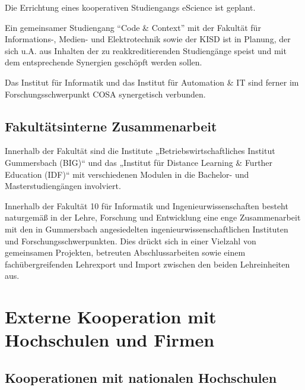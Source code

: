 Die Errichtung eines kooperativen Studiengangs eScience ist geplant.

Ein gemeinsamer Studiengang ``Code \& Context'' mit der Fakultät für
Informations-, Medien- und Elektrotechnik sowie der KISD ist in Planung,
der sich u.A. aus Inhalten der zu reakkreditierenden Studiengänge speist
und mit dem entsprechende Synergien geschöpft werden sollen.

Das Institut für Informatik und das Institut für Automation \& IT sind
ferner im Forschungsschwerpunkt COSA synergetisch verbunden.

\subsection{Fakultätsinterne
Zusammenarbeit\label{/mi-2017/selbstbericht/0700-studiengangsbezogene-kooperationen/0000-studiengangsbezogene-kooperationen}}\label{fakultuxe4tsinterne-zusammenarbeitpathlabelmi-2017selbstbericht0700-studiengangsbezogene-kooperationen0000-studiengangsbezogene-kooperationen}

Innerhalb der Fakultät sind die Institute „Betriebswirtschaftliches
Institut Gummersbach (BIG)`` und das „Institut für Distance Learning \&
Further Education (IDF)`` mit verschiedenen Modulen in die Bachelor- und
Masterstudiengängen involviert.

Innerhalb der Fakultät 10 für Informatik und Ingenieurwissenschaften
besteht naturgemäß in der Lehre, Forschung und Entwicklung eine enge
Zusammenarbeit mit den in Gummersbach angesiedelten
ingenieurwissenschaftlichen Instituten und Forschungsschwerpunkten. Dies
drückt sich in einer Vielzahl von gemeinsamen Projekten, betreuten
Abschlussarbeiten sowie einem fachübergreifenden Lehrexport und Import
zwischen den beiden Lehreinheiten aus.

\section{Externe Kooperation mit Hochschulen und
Firmen\label{/mi-2017/selbstbericht/0700-studiengangsbezogene-kooperationen/0000-studiengangsbezogene-kooperationen}}\label{externe-kooperation-mit-hochschulen-und-firmenpathlabelmi-2017selbstbericht0700-studiengangsbezogene-kooperationen0000-studiengangsbezogene-kooperationen}

\subsection{Kooperationen mit nationalen
Hochschulen\label{/mi-2017/selbstbericht/0700-studiengangsbezogene-kooperationen/0000-studiengangsbezogene-kooperationen}}\label{kooperationen-mit-nationalen-hochschulenpathlabelmi-2017selbstbericht0700-studiengangsbezogene-kooperationen0000-studiengangsbezogene-kooperationen}

